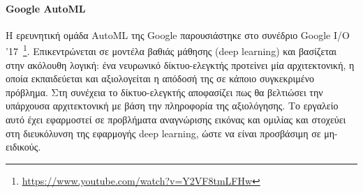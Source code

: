  \paragraph{Google AutoML} Η ερευνητική ομάδα AutoML της Google παρουσιάστηκε στο συνέδριο Goo\-gle I/O '17~\footnote{\url{https://www.youtube.com/watch?v=Y2VF8tmLFHw}}. Επικεντρώνεται σε μοντέλα βαθιάς μάθησης (deep learning) και βασίζεται στην ακόλουθη λογική: ένα νευρωνικό δίκτυο-ελεγκτής προτείνει μία αρχιτεκτονική, η οποία εκπαιδεύεται και αξιολογείται η απόδοσή της σε κάποιο συγκεκριμένο πρόβλημα. Στη συνέχεια το δίκτυο-ελεγκτής αποφασίζει πως θα βελτιώσει την υπάρχουσα αρχιτεκτονική με βάση την πληροφορία της αξιολόγησης. Το εργαλείο αυτό έχει εφαρμοστεί σε προβλήματα αναγνώρισης εικόνας και ομιλίας και στοχεύει στη διευκόλυνση της εφαρμογής deep learning, ώστε να είναι προσβάσιμη σε μη-ειδικούς.
 